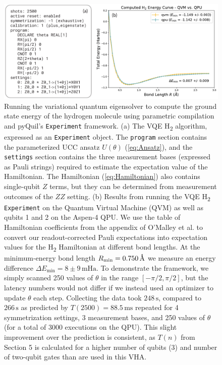 \documentclass[12pt]{iopart}
\begin{document}
\begin{figure}
    \centering
    \includegraphics[width=\textwidth]{figures/variational-quantum-eigensolver.pdf}
    \caption{
    Running the variational quantum eigensolver to compute the ground state energy of the hydrogen molecule using parametric compilation and pyQuil's \texttt{Experiment} framework. (a) The VQE H\textsubscript{2} algorithm, expressed as an \texttt{Experiment} object. The \texttt{program} section contains the parameterized UCC ansatz $U(\theta)$ (\cref{eq:Ansatz}), and the \texttt{settings} section contains the three measurement bases (expressed as Pauli strings) required to estimate the expectation value of the Hamiltonian. The Hamiltonian (\cref{eq:Hamiltonian}) also contains single-qubit $Z$ terms, but they can be determined from measurement outcomes of the $ZZ$ setting. (b) Results from running the VQE H\textsubscript{2} \texttt{Experiment} on the Quantum Virtual Machine (QVM) \cite{RigettiQVM} as well as qubits 1 and 2 on the Aspen-4 QPU. We use the table of Hamiltonian coefficients from the appendix of O'Malley et al. to convert our readout-corrected Pauli expectations into expectation values for the H\textsubscript{2} Hamiltonian at different bond lengths. At the minimum-energy bond length $R_{\textrm{min}} = 0.750\,\textup{\AA}$ we measure an energy difference $\Delta E_{\textrm{min}} = 8 \pm 9\,\mathrm{mHa}$. To demonstrate the framework, we simply scanned 250 values of $\theta$ in the range $[-\pi/2, \pi/2]$, but the latency numbers would not differ if we instead used an optimizer to update $\theta$ each step. Collecting the data took $248\,\textrm{s}$, compared to $266\,\textrm{s}$ as predicted by $T(2500) = 88.5\,\textrm{ms}$ repeated for 4 symmetrization settings, 3 measurement bases, and 250 values of $\theta$ (for a total of 3000 executions on the QPU). This slight improvement over the prediction is consistent, as $T(n)$ from Section 5 is calculated for a higher number of qubits (3) and number of two-qubit gates than are used in this VHA.}
    \label{fig:VQE}
\end{figure}
\end{document}
